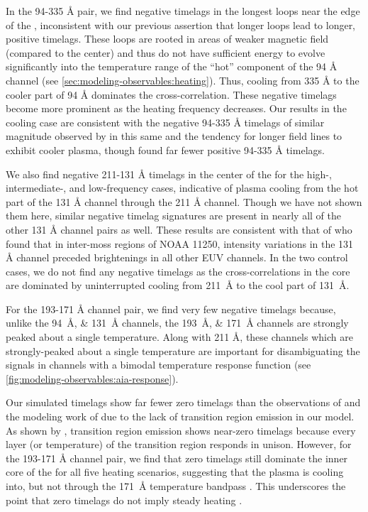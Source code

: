 In the 94-335 \si{\angstrom} pair, we find negative timelags in the longest loops near the edge of the \AR{}, inconsistent with our previous assertion that longer loops lead to longer, positive timelags. These loops are rooted in areas of weaker magnetic field (compared to the center) and thus do not have sufficient energy to evolve significantly into the temperature range of the ``hot'' component of the 94 \si{\angstrom} channel (see \autoref{sec:modeling-observables:heating}). Thus, cooling from 335 \si{\angstrom} to the cooler part of 94 \si{\angstrom} dominates the cross-correlation. These negative timelags become more prominent as the heating frequency decreases. Our results in the cooling case are consistent with the negative 94-335 \si{\angstrom} timelags of similar magnitude observed by \citet{viall_survey_2017} in this same \AR{} and the tendency for longer field lines to exhibit cooler plasma, though \citeauthor{viall_survey_2017} found far fewer positive 94-335 \si{\angstrom} timelags.

We also find negative 211-131 \si{\angstrom} timelags in the center of the \AR{} for the high-, intermediate-, and low-frequency cases, indicative of plasma cooling from the hot part of the 131 \si{\angstrom} channel through the 211 \si{\angstrom} channel. Though we have not shown them here, similar negative timelag signatures are present in nearly all of the other 131 \si{\angstrom} channel pairs as well. These results are consistent with that of \citet{cadavid_heating_2014} who found that in inter-moss regions of \AR{} NOAA 11250, intensity variations in the 131 \si{\angstrom} channel preceded brightenings in all other EUV channels. In the two control cases, we do not find any negative timelags as the cross-correlations in the core are dominated by uninterrupted cooling from \SI{211}{\angstrom} to the cool part of \SI{131}{\angstrom}.

For the 193-171 \si{\angstrom} channel pair, we find very few negative timelags because, unlike the \SIlist{94;131}{\angstrom} channels, the \SIlist{193;171}{\angstrom} channels are strongly peaked about a single temperature. Along with 211 \si{\angstrom}, these channels which are strongly-peaked about a single temperature are important for disambiguating the signals in channels with a bimodal temperature response function (see \autoref{fig:modeling-observables:aia-response}).

Our simulated timelags show far fewer zero timelags than the observations of \citet{viall_evidence_2012,viall_survey_2017} and the modeling work of \citet{bradshaw_patterns_2016} due to the lack of transition region emission in our model. As shown by \citet{viall_transition_2015}, transition region emission shows near-zero timelags because every layer (or temperature) of the transition region responds in unison. However, for the 193-171 \si{\angstrom} channel pair, we find that zero timelags still dominate the inner core of the \AR{} for all five heating scenarios, suggesting that the plasma is cooling into, but not through the \SI{171}{\angstrom} temperature bandpass \citep{viall_survey_2017}. This underscores the point that zero timelags do not imply steady heating \citep{viall_transition_2015,viall_signatures_2016}.

